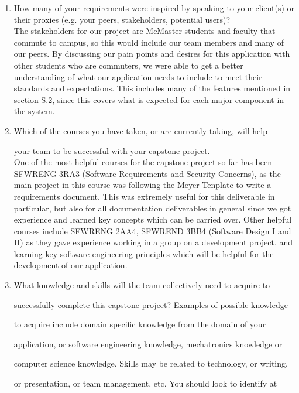 \documentclass[12pt,letterpaper]{article}
\begin{document}
\begin{enumerate}
  \item How many of your requirements were inspired by speaking to your   client(s) or their proxies (e.g. your peers, stakeholders, potential users)? \\
 

  The stakeholders for our project are McMaster students and faculty that commute to campus, so this would include our team members and many of our peers. By discussing our pain points and desires for this application
  with other students who are commuters, we were able to get a better understanding of what our application needs to include to meet their standards and expectations. This includes many of the features mentioned in section S.2,
  since this covers what is expected for each major component in the system. 
 

  \item Which of the courses you have taken, or are currently taking, will help 

  your team to be successful with your capstone project. \\

One of the most helpful courses for the capstone project so far has been SFWRENG 3RA3 (Software Requirements and Security Concerns), as the main project in this course was following the Meyer Tenplate to write a requirements document. 
This was extremely useful for this deliverable in particular, but also for all documentation deliverables in general since we got experience and learned key concepts which can be carried over. 
Other helpful courses include SFWRENG 2AA4, SFWREND 3BB4 (Software Design I and II) as they gave experience working in a group on a development project, and learning key software engineering principles which will be helpful
for the development of our application. 
 

  \item What knowledge and skills will the team collectively need to acquire to 

  successfully complete this capstone project?  Examples of possible knowledge 

  to acquire include domain specific knowledge from the domain of your 

  application, or software engineering knowledge, mechatronics knowledge or 

  computer science knowledge.  Skills may be related to technology, or writing, 

  or presentation, or team management, etc.  You should look to identify at 


\end{enumerate}
\end{document}
